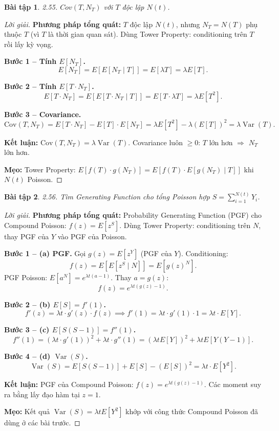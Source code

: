 \documentclass[8pt,a4paper]{article}
\newtheorem{exercise}{Bài tập}
\newenvironment{solution}{\begin{proof}[Lời giải]}{\end{proof}}
\newcommand{\Var}{\operatorname{Var}}
\begin{document}
\begin{exercise}
2.55. $Cov(T, N_T)$ với $T$ độc lập $N(t)$.
\end{exercise}
\begin{solution}
\textbf{Phương pháp tổng quát:} $T$ độc lập $N(t)$, nhưng $N_T = N(T)$ phụ thuộc $T$ (vì $T$ là thời gian quan sát). Dùng Tower Property: conditioning trên $T$ rồi lấy kỳ vọng.

\textbf{Bước 1 -- Tính $E[N_T]$.}
\[
  E[N_T] = E[E[N_T \mid T]] = E[\lambda T] = \lambda E[T].
\]

\textbf{Bước 2 -- Tính $E[T \cdot N_T]$.}
\[
  E[T \cdot N_T] = E[E[T \cdot N_T \mid T]] = E[T \cdot \lambda T] = \lambda E[T^2].
\]

\textbf{Bước 3 -- Covariance.}
\[
  \text{Cov}(T, N_T) = E[T \cdot N_T] - E[T] \cdot E[N_T] = \lambda E[T^2] - \lambda(E[T])^2 = \boxed{\lambda \Var(T)}.
\]

\textbf{Kết luận:} $\text{Cov}(T, N_T) = \lambda \Var(T)$. Covariance luôn $\geq 0$: $T$ lớn hơn $\Rightarrow$ $N_T$ lớn hơn.

\textbf{Mẹo:} Tower Property: $E[f(T) \cdot g(N_T)] = E[f(T) \cdot E[g(N_T) \mid T]]$ khi $N(t)$ Poisson.
\end{solution}

\begin{exercise}
2.56. Tìm Generating Function cho tổng Poisson hợp $S = \sum_{i=1}^{N(t)} Y_i$.
\end{exercise}
\begin{solution}
\textbf{Phương pháp tổng quát:} Probability Generating Function (PGF) cho Compound Poisson: $f(z) = E[z^S]$. Dùng Tower Property: conditioning trên $N$, thay PGF của $Y$ vào PGF của Poisson.

\textbf{Bước 1 -- (a) PGF.} Gọi $g(z) = E[z^Y]$ (PGF của $Y$). Conditioning:
\[
  f(z) = E[E[z^S \mid N]] = E[g(z)^N].
\]
PGF Poisson: $E[a^N] = e^{\lambda t(a-1)}$. Thay $a = g(z)$:
\[
  \boxed{f(z) = e^{\lambda t(g(z) - 1)}}.
\]

\textbf{Bước 2 -- (b) $E[S] = f'(1)$.}
\[
  f'(z) = \lambda t \cdot g'(z) \cdot f(z) \implies f'(1) = \lambda t \cdot g'(1) \cdot 1 = \boxed{\lambda t \cdot E[Y]}.
\]

\textbf{Bước 3 -- (c) $E[S(S-1)] = f''(1)$.}
\[
  f''(1) = (\lambda t \cdot g'(1))^2 + \lambda t \cdot g''(1) = (\lambda t E[Y])^2 + \lambda t E[Y(Y-1)].
\]

\textbf{Bước 4 -- (d) $\Var(S)$.}
\[
  \Var(S) = E[S(S-1)] + E[S] - (E[S])^2 = \boxed{\lambda t \cdot E[Y^2]}.
\]

\textbf{Kết luận:} PGF của Compound Poisson: $f(z) = e^{\lambda t(g(z)-1)}$. Các moment suy ra bằng lấy đạo hàm tại $z=1$.

\textbf{Mẹo:} Kết quả $\Var(S) = \lambda t E[Y^2]$ khớp với công thức Compound Poisson đã dùng ở các bài trước.
\end{solution}
\end{document}
